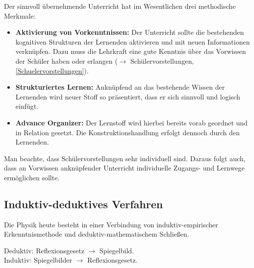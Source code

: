 \bip
Der sinnvoll übernehmende Unterricht hat im Wesentlichen drei methodische Merkmale:
\begin{itemize}
	\item \textbf{Aktivierung von Vorkenntnissen:} Der Unterricht sollte die bestehenden kognitiven Strukturen der Lernenden aktivieren und mit neuen Informationen verknüpfen. Dazu muss die Lehrkraft eine gute Kenntnis über das Vorwissen der Schüler haben oder erlangen ($\to$ Schülervorstellungen, \cref{Schuelervorstellungen}).
	\item \textbf{Strukturiertes Lernen:} Anknüpfend an das bestehende Wissen der Lernenden wird neuer Stoff so präsentiert, dass er sich sinnvoll und logisch einfügt.
	\item \textbf{Advance Organizer:} Der Lernstoff wird hierbei bereits vorab geordnet und in Relation gesetzt. Die Konstruktionshandlung erfolgt dennoch durch den Lernenden.
\end{itemize}
Man beachte, dass Schülervorstellungen sehr individuell sind. Daraus folgt auch, dass an Vorwissen anknüpfender Unterricht individuelle Zugangs- und Lernwege ermöglichen sollte.



\subsection{Induktiv-deduktives Verfahren}
Die Physik heute besteht in einer Verbindung von
induktiv-empirischer Erkenntnismethode und
deduktiv-mathematischem Schlie{\ss}en.

\begin{beisp2}
	Deduktiv:  Reflexionsgesetz  $\to$ Spiegelbild. \\
Induktiv: Spiegelbilder $\to$ Reflexionsgesetz.
\end{beisp2}

